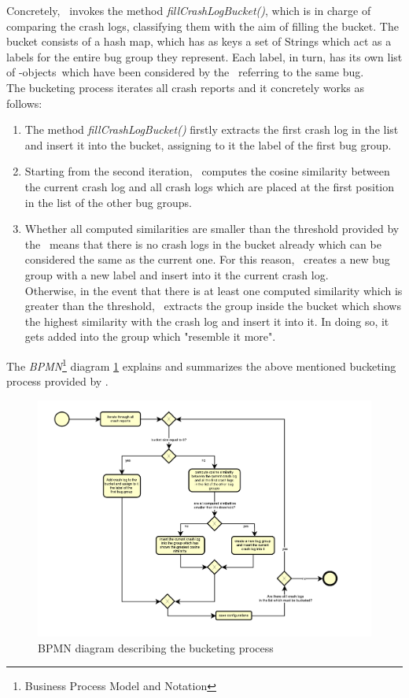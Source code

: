 Concretely, \toolname\ invokes the method \textit{fillCrashLogBucket()}, which is in charge of comparing the crash logs, classifying them with the aim of filling the bucket. 
The bucket consists of a hash map, which has as keys a set of Strings which act as a labels for the entire bug group they represent. Each label, in turn, has its own list of \Crash-objects\, which have been considered by the \Oracle\ referring to the same bug.  \\
The bucketing process iterates all crash reports and it concretely works as follows: 
\begin{enumerate}
\item The method \textit{fillCrashLogBucket()} firstly extracts the first crash log in the list and insert it into the bucket, assigning to it the label of the first bug group. 
\item Starting from the second iteration, \toolname\ computes the cosine similarity between the current crash log and all crash logs which are placed at the first position in the list of the other bug groups. 
\item Whether all computed similarities are smaller than the threshold provided by the \Oracle\, means that there is no crash logs in the bucket already which can be considered the same as the current one. For this reason, \toolname\ creates a new bug group with a new label and insert into it the current crash log. \\
Otherwise, in the event that there is at least one computed similarity which is greater than the threshold, \toolname\ extracts the group inside the bucket which shows the highest similarity with the crash log and insert it into it.
In doing so, it gets added into the group which "resemble it more". 
\end{enumerate}
The \textit{BPMN}\footnote{Business Process Model and Notation} diagram \ref{bucketing} explains and summarizes the above mentioned bucketing process provided by \toolname. \\

\begin{figure}[tb]
\centering 
\includegraphics[width=\columnwidth]{diagrams/bucketingprocess.pdf} 
\caption{BPMN diagram describing the bucketing process}
\label{bucketing}
\end{figure}

